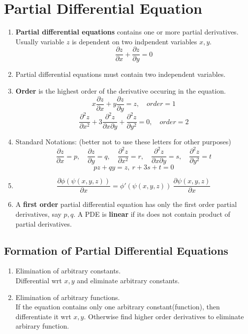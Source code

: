 \section{Partial Differential Equation}
\begin{enumerate}
	\item \textbf{Partial differential equations} contains one or more partial derivatives. Usually variable $z$ is dependent on two indpendent variables $x,y$.
		$$ \frac{\partial z}{\partial x} + \frac{\partial z}{\partial y} = 0$$
	\item Partial differential equations must contain two independent variables.
	\item \textbf{Order} is the highest order of the derivative occuring in the equation.
		$$ x\frac{\partial z}{\partial x} + y \frac{\partial z}{\partial y} = z,\quad order = 1$$
		$$ \frac{\partial ^2z}{\partial x^2} + 3\frac{\partial^2 z}{\partial x \partial y} + \frac{\partial^2 z}{\partial y^2} = 0, \quad order = 2$$
	\item Standard Notations: (better not to use these letters for other purposes)
		$$ \frac{\partial z}{\partial x} = p,\quad \frac{\partial z}{\partial y} = q,\quad \frac{\partial^2 z}{\partial x^2} = r,\quad \frac{\partial^2 z}{\partial x \partial y} = s,\quad \frac{\partial^2 z}{\partial y^2} = t$$
		$$ pz+qy = z,\ r+3s+t = 0$$
	\item $$ \frac{\partial \phi(\psi(x,y,z))}{\partial x} = \phi'(\psi(x,y,z))\ \frac{\partial \psi(x,y,z)}{\partial x} $$
	\item A \textbf{first order} partial differential equation has only the first order partial derivatives, say $p,q$. A PDE is \textbf{linear} if its does not contain product of partial derivatives.
\end{enumerate}
\subsection{Formation of Partial Differential Equations}
\begin{enumerate}
	\item Elimination of arbitrary constants.\\
		Differential wrt $x,y$ and eliminate arbitrary constants.
	\item Elimination of arbitrary functions.\\
		If the equation contains only one arbitrary constant(function), then differentiate it wrt $x,y$. Otherwise find higher order derivatives to eliminate arbirary function.
\end{enumerate}

